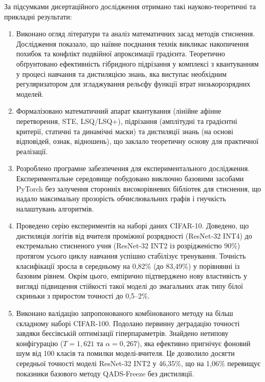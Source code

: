 \documentclass{pma-mthesis}
\begin{document}
\conclusions
За підсумками дисертаційного дослідження отримано такі науково-теоретичні та прикладні результати:
\begin{enumerate}
    \item Виконано огляд літератури та аналіз математичних засад методів стиснення. Дослідження показало, що наївне поєднання технік викликає накопичення похибок та конфлікт подвійної апроксимації градієнта. Теоретично обґрунтовано ефективність гібридного підрізання у комплексі з квантуванням у процесі навчання та дистиляцією знань, яка виступає необхідним регуляризатором для згладжування рельєфу функції втрат низькорозрядних моделей.

    \item Формалізовано математичний апарат квантування (лінійне афінне перетворення, STE, LSQ/LSQ+), підрізання (амплітудні та градієнтні критерії, статичні та динамічні маски) та дистиляції знань (на основі відповідей, ознак, відношень), що заклало теоретичну основу для практичної реалізації.
        
    \item Розроблено програмне забезпечення для експериментального дослідження. Експериментальне середовище побудовано виключно базовими засобами PyTorch без залучення сторонніх високорівневих бібліотек для стиснення, що надало максимальну прозорість обчислювальних графів і гнучкість налаштувань алгоритмів.

    \item Проведено серію експериментів на наборі даних CIFAR-10. Доведено, що дистиляція логітів від вчителя проміжної розрядності (ResNet-32 INT4) до екстремально стисненого учня (ResNet-32 INT2 із розрідженістю 90\%) протягом усього циклу навчання успішно стабілізує тренування. Точність класифікації зросла в середньому на 0,82\% (до 83,49\%) у порівнянні із базовим рівнем. Окрім цього, емпірично підтверджено нову властивість у вигляді підвищення стійкості такої моделі до змагальних атак типу білої скриньки з приростом точності до 0,5--2\%.

    \item Виконано валідацію запропонованого комбінованого методу на більш складному наборі CIFAR-100. Подолано первинну деградацію точності завдяки беєсівській оптимізації гіперпараметрів. Знайдено нетипову конфігурацію ($T=1,621$ та $\alpha=0,267$), яка ефективно пригнічує фоновий шум від 100 класів та помилки моделі-вчителя. Це дозволило досягти середньої точності моделі ResNet-32 INT2 у 46,35\%, що на 1,06\% перевищує показники базового методу QADS-Freeze без дистиляції.
\end{enumerate}
\end{document}
